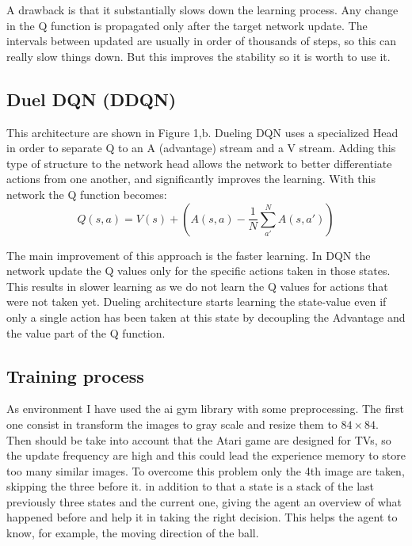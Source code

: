 \documentclass[10pt]{article}
\begin{document}
\begin{multicols}{2}
A drawback is that it substantially slows down the learning process. Any change in the Q function is propagated only after the target network update. The intervals between updated are usually in order of thousands of steps, so this can really slow things down. But this improves the stability so it is worth to use it.

\subsection{Duel DQN (DDQN)}
This architecture are shown in Figure 1,b. Dueling DQN uses a specialized Head in order to separate Q to an A (advantage) stream and a V stream. Adding this type of structure to the network head allows the network to better differentiate actions from one another, and significantly improves the learning. With this network the Q function becomes: 
\[
Q(s, a) = V(s) + (A(s, a) - \frac{1}{N} \sum_{a'}^{N} A(s, a'))
\]

The main improvement of this approach is the faster learning. In DQN the network update the Q values only for the specific actions taken in those states. This results in slower learning as we do not learn the Q values for actions that were not taken yet. Dueling architecture starts learning the state-value even if only a single action has been taken at this state by decoupling the Advantage and the value part of the Q function.

\subsection{Training process}

As environment I have used the ai gym library with some preprocessing. The first one consist in transform the images to gray scale and resize them to $84\times84$. Then should be take into account that the Atari game are designed for TVs, so the update frequency are high and this could lead the experience memory to store too many similar images. To overcome this problem only the 4th image are taken, skipping the three before it. in addition to that a state is a stack of the last previously three states and the current one, giving the agent an overview of what happened before and help it in taking the right decision. This helps the agent to know, for example, the moving direction of the ball.


\end{multicols}
\end{document}
